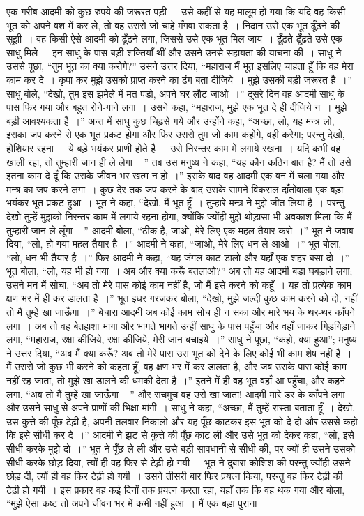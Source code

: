 एक गरीब आदमी को कुछ रुपये की जरूरत पड़ी~। उसे कहीं से यह मालूम हो गया कि यदि वह किसी भूत को अपने वश में कर ले, तो वह उससे जो चाहे मँगवा सकता है~। निदान उसे एक भूत ढूँढ़ने की सूझी~। वह किसी ऐसे आदमी को ढूँढ़ने लगा, जिससे उसे एक भूत मिल जाय~। ढूँढ़ते-ढूँढ़ते उसे एक साधु मिले~। इन साधु के पास बड़ी शक्तियाँ थीं और उसने उनसे सहायता की याचना की~। साधु ने उससे पूछा, “तुम भूत का क्या करोगे?” उसने उत्तर दिया, “महाराज मैं भूत इसलिए चाहता हूँ कि वह मेरा काम कर दे~। कृपा कर मुझे उसको प्राप्त करने का ढंग बता दीजिये~। मुझे उसकी बड़ी जरूरत है~।” साधु बोले, “देखो, तुम इस झमेले में मत पड़ो, अपने घर लौट जाओ~।” दूसरे दिन वह आदमी साधु के पास फिर गया और बहुत रोने-गाने लगा~। उसने कहा, “महाराज, मुझे एक भूत दे ही दीजिये न~। मुझे बड़ी आवश्यकता है~।” अन्त में साधु कुछ चिढ़से गये और उन्होंने कहा, “अच्छा, लो, यह मन्त्र लो, इसका जप करने से एक भूत प्रकट होगा और फिर उससे तुम जो काम कहोगे, वही करेगा; परन्तु देखो, होशियार रहना~। ये बड़े भयंकर प्राणी होते है~। उसे निरन्तर काम में लगाये रखना~। यदि कभी वह खाली रहा, तो तुम्हारी जान ही ले लेगा~।” तब उस मनुष्य ने कहा, “यह कौन कठिन बात है? मैं तो उसे इतना काम दे दूँ कि उसके जीवन भर खत्म न हो~।” इसके बाद वह आदमी एक वन में चला गया और मन्त्र का जप करने लगा~। कुछ देर तक जप करने के बाद उसके सामने विकराल दाँतोंवाला एक बड़ा भयंकर भूत प्रकट हुआ~। भूत ने कहा, “देखो, मैं भूत हूँ~। तुम्हारे मन्त्र ने मुझे जीत लिया है~। परन्तु देखो तुम्हें मुझको निरन्तर काम में लगाये रहना होगा, क्योंकि ज्योंही मुझे थोड़ासा भी अवकाश मिला कि मैं तुम्हारी जान ले लूँगा~।” आदमी बोला, “ठीक है, जाओ, मेरे लिए एक महल तैयार करो~।” भूत ने जवाब दिया, “लो, हो गया महल तैयार है~।” आदमी ने कहा, “जाओ, मेरे लिए धन ले आओ~।” भूत बोला, “लो, धन भी तैयार है~।” फिर आदमी ने कहा, “यह जंगल काट डालो और यहाँ एक शहर बसा दो~।” भूत बोला, “लो, यह भी हो गया~। अब और क्या करूँ बतलाओ?” अब तो यह आदमी बड़ा घबड़ाने लगा; उसने मन में सोचा, “अब तो मेरे पास कोई काम नहीं है, जो मैं इसे करने को कहूँ~। यह तो प्रत्येक काम क्षण भर में ही कर डालता है~।” भूत इधर गरजकर बोला, “देखो, मुझे जल्दी कुछ काम करने को दो, नहीं तो मैं तुम्हें खा जाऊँगा~।” बेचारा आदमी अब कोई काम सोच ही न सका और मारे भय के थर-थर काँपने लगा~। अब तो वह बेतहाशा भागा और भागते भागते उन्हीं साधु के पास पहुँचा और वहाँ जाकर गिड़गिड़ाने लगा, “महाराज, रक्षा कीजिये, रक्षा कीजिये, मेरी जान बचाइये~।” साधु ने पूछा, “कहो, क्या हुआ”; मनुष्य ने उत्तर दिया, “अब मैं क्या करूँ? अब तो मेरे पास उस भूत को देने के लिए कोई भी काम शेष नहीं है~। मैं उससे जो कुछ भी करने को कहता हूँ, वह क्षण भर में कर डालता है, और जब उसके पास कोई काम नहीं रह जाता, तो मुझे खा डालने की धमकी देता है~।” इतने में ही वह भूत वहाँ आ पहुँचा, और कहने लगा, “अब तो मैं तुम्हें खा जाऊँगा~।” और सचमुच वह उसे खा जाता! आदमी मारे डर के काँपने लगा और उसने साधु से अपने प्राणों की भिक्षा मांगी~। साधु ने कहा, “अच्छा, मैं तुम्हें रास्ता बताता हूँ~। देखो, उस कुत्ते की पूँछ टेढ़ी है, अपनी तलवार निकालो और यह पूँछ काटकर इस भूत को दे दो और उससे कहो कि इसे सीधी कर दे~।” आदमी ने झट से कुत्ते की पूँछ काट ली और उसे भूत को देकर कहा, “लो, इसे सीधी करके मुझे दो~।” भूत ने पूँछ ले ली और उसे बड़ी सावधानी से सीधी की, पर ज्यों ही उसने उसको सीधी करके छोड़ दिया, त्यों ही वह फिर से टेढ़ी हो गयी~। भूत ने दुबारा कोशिश की परन्तु ज्योंही उसने छोड़ दी, त्यों ही वह फिर टेढ़ी हो गयी~। उसने तीसरी बार फिर प्रयत्न किया, परन्तु वह फिर टेढ़ी की टेढ़ी हो गयी~। इस प्रकार वह कई दिनों तक प्रयत्न करता रहा, यहाँ तक कि वह थक गया और बोला, “मुझे ऐसा कष्ट तो अपने जीवन भर में कभी नहीं हुआ~। मैं एक बड़ा पुराना 